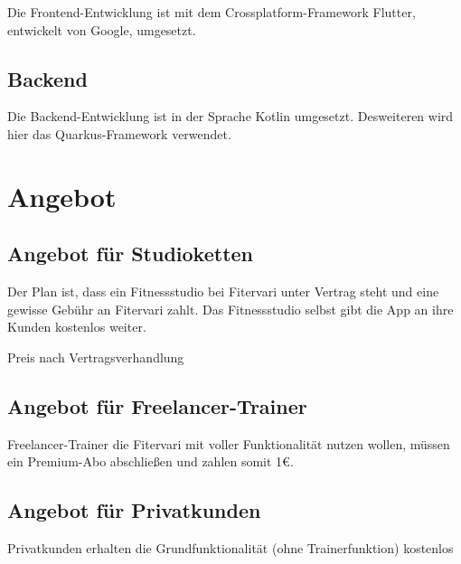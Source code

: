 \documentclass[12pt]{article}
\theoremstyle{definition}
\begin{document}
Die Frontend-Entwicklung ist mit dem Crossplatform-Framework Flutter, entwickelt von Google, umgesetzt.

\subsection{Backend}

Die Backend-Entwicklung ist in der Sprache Kotlin umgesetzt. Desweiteren wird hier das Quarkus-Framework verwendet.


\pagebreak

\section{Angebot}
\subsection{Angebot für Studioketten}

Der Plan ist, dass ein Fitnessstudio bei Fitervari unter Vertrag steht und eine gewisse Gebühr an Fitervari zahlt. Das Fitnessstudio selbst gibt die App an ihre Kunden kostenlos weiter.


Preis nach Vertragsverhandlung

\subsection{Angebot für Freelancer-Trainer}

Freelancer-Trainer die Fitervari mit voller Funktionalität nutzen wollen, müssen ein Premium-Abo abschließen und zahlen somit 1€.

\subsection{Angebot für Privatkunden}

Privatkunden erhalten die Grundfunktionalität (ohne Trainerfunktion) kostenlos
\end{document}
